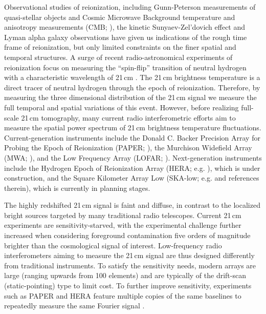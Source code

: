 \documentclass[twocolumn,apj,numberedappendix]{emulateapj}
\renewcommand\[{\begin{equation}}
\renewcommand\]{\end{equation}}
\begin{document}
Observational studies of reionization, including Gunn-Peterson measurements of quasi-stellar objects \citep{Fan2006} and Cosmic Microwave Background temperature and anisotropy measurements (CMB; \citealt{Planck2016}), the kinetic Sunyaev-Zel'dovich effect \citep{ZahnKSZ, GeorgeKSZ, kszpatchy} and Lyman alpha galaxy observations \citep{Rhoads2017, Rhoads2012, mcquinnLyA} have given us indications of the rough time frame of reionization, but only limited constraints on the finer spatial and temporal structures. A surge of recent radio-astronomical experiments of reionization focus on measuring the ``spin-flip'' transition of neutral
hydrogen with a characteristic wavelength of 21\,cm \citep{Furlanetto2006181,PritchardLoeb}.
The 21\,cm brightness temperature is a direct tracer of neutral hydrogen through the epoch of reionization. Therefore, by measuring the three dimensional distribution of the 21\,cm signal we measure the full temporal and spatial variations of this event. 
However, before realizing full-scale 21\,cm tomography, many current radio interferometric efforts
aim to measure the spatial power spectrum of 21\,cm brightness temperature fluctuations.
Current-generation instruments include the Donald C. Backer Precision Array for Probing
the Epoch of Reionization (PAPER; \citealt{Ali2015,paper32}), the Murchison
Widefield Array (MWA; \citealt{Bowman2013, Tingay2013}), and the Low Frequency Array (LOFAR; \citealt{LOFAR}). Next-generation instruments include the Hydrogen Epoch of Reionization
Array (HERA; e.g. \citealt{HERA,JoshAntPos,HERABEAM1,HERADISH2}), which is under construction, 
and the Square Kilometer Array Low (SKA-low; e.g. \citealt{skalow2015} and references therein), which is currently in planning stages. 

The highly redshifted 21\,cm signal is faint and diffuse, in contrast to the localized bright sources targeted by many traditional radio telescopes.  Current 21\,cm experiments are sensitivity-starved, with the experimental challenge further increased when considering foreground contamination five orders of magnitude brighter than the cosmological signal of interest. Low-frequency radio interferometers aiming to measure the 21\,cm signal are thus designed differently from traditional instruments. To satisfy the sensitivity needs, modern arrays are large (ranging upwards from 100 elements) and are typically of the drift-scan (static-pointing) type to limit cost. To further improve sensitivity, experiments such as PAPER and HERA feature multiple copies of the same baselines to repeatedly measure the same Fourier signal \citep{first-paper}. 
\end{document}
